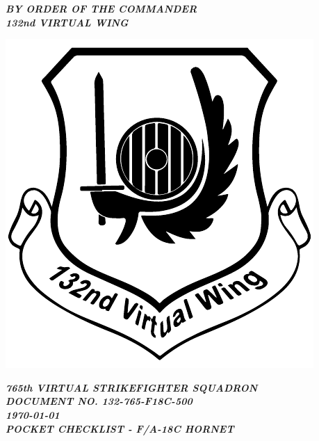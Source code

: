 \begin{titlepage}
	\begin{center}

        \begin{flushleft}
          \small
          \textbf{\textit{BY ORDER OF THE COMMANDER\\132nd VIRTUAL WING\\}}
        \end{flushleft}

        \begin{flushleft}
        	\includegraphics[scale=0.4]{132nd.pdf}
        \end{flushleft}
        
        \vspace*{-5.6cm}
        
        \begin{flushright}
          \small
          \textbf{\textit{765th VIRTUAL STRIKEFIGHTER SQUADRON}}\\
          \textbf{\textit{DOCUMENT NO. 132-765-F18C-500}}\\
          \vspace*{2.6cm}
          \textbf{\textit{\today}}\\
          \textbf{\textit{POCKET CHECKLIST - F/A-18C HORNET}}\\
        \end{flushright}
        

\end{center}
\end{titlepage}
